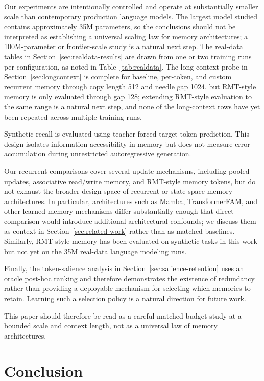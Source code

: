 \documentclass[10pt]{article} %
\begin{document}
Our experiments are intentionally controlled and operate at substantially
smaller scale than contemporary production language models. The largest
model studied contains approximately 35M parameters, so the conclusions
should not be interpreted as establishing a universal scaling law for
memory architectures; a 100M-parameter or frontier-scale study is a
natural next step. The real-data tables in Section~\ref{sec:realdata-results} are drawn
from one or two training runs per configuration, as noted in
Table~\ref{tab:realdata}. The long-context probe in
Section~\ref{sec:longcontext} is complete for baseline, per-token, and
custom recurrent memory through copy length 512 and needle gap 1024, but
RMT-style memory is only evaluated through gap 128; extending RMT-style
evaluation to the same range is a natural next step, and none of the
long-context rows have yet been repeated across multiple training runs.

Synthetic recall is evaluated using teacher-forced target-token
prediction. This design isolates information accessibility in memory but
does not measure error accumulation during unrestricted autoregressive
generation.

Our recurrent comparisons cover several update mechanisms, including
pooled updates, associative read/write memory, and RMT-style memory
tokens, but do not exhaust the broader design space of recurrent or
state-space memory architectures. In particular, architectures such as
Mamba, TransformerFAM, and other learned-memory mechanisms differ
substantially enough that direct comparison would introduce additional
architectural confounds; we discuss them as context in
Section~\ref{sec:related-work} rather than as matched baselines.
Similarly, RMT-style memory has been evaluated on synthetic tasks in this
work but not yet on the 35M real-data language modeling runs.

Finally, the token-salience analysis in Section~\ref{sec:salience-retention}
uses an oracle post-hoc ranking and therefore demonstrates the existence
of redundancy rather than providing a deployable mechanism for selecting
which memories to retain. Learning such a selection policy is a natural
direction for future work.

This paper should therefore be read as a careful matched-budget study at a
bounded scale and context length, not as a universal law of memory
architectures.

\section{Conclusion}
\end{document}
